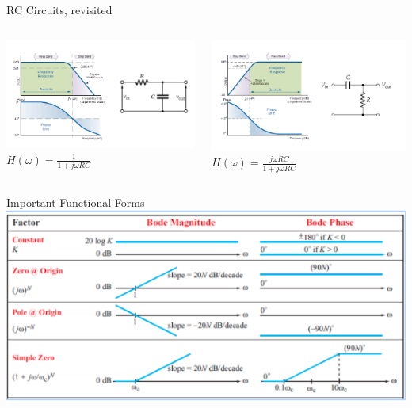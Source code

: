 \documentclass{beamer}
\begin{document}
    \begin{frame}{RC Circuits, revisited}
        \begin{columns}
            \begin{column}{0.5\textwidth}
                \includegraphics[scale=0.75]{Rc-circuits-revisited-1.png}\\
                $H(\omega) = \frac{1}{1 + j\omega RC}$
            \end{column}
            \begin{column}{0.5\textwidth}
                \includegraphics[scale=0.75]{rc-circuits-revisited-2.png}\\
                $H(\omega) = \frac{j\omega RC}{1 + j\omega RC}$
            \end{column}
            
        \end{columns}
    \end{frame}
    \begin{frame}{Important Functional Forms}
        \includegraphics[scale=0.75]{important-functional-forms-1.png}
    \end{frame}
\end{document}
